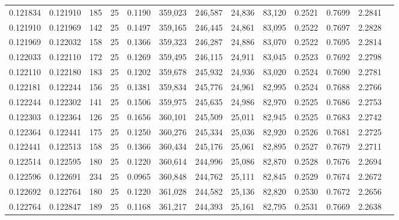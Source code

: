 \begin{tabular}{rrrrrrrrrrrrr}
0.121834 & 0.121910 &   185 &  25 &                                     0.1190 & 359,023 & 246,587 &  24,836 &  83,120 & 0.2521 & 0.7699 & 2.2841 \\
0.121910 & 0.121969 &   142 &  25 &                                     0.1497 & 359,165 & 246,445 &  24,861 &  83,095 & 0.2522 & 0.7697 & 2.2828 \\
0.121969 & 0.122032 &   158 &  25 &                                     0.1366 & 359,323 & 246,287 &  24,886 &  83,070 & 0.2522 & 0.7695 & 2.2814 \\
0.122033 & 0.122110 &   172 &  25 &                                     0.1269 & 359,495 & 246,115 &  24,911 &  83,045 & 0.2523 & 0.7692 & 2.2798 \\
0.122110 & 0.122180 &   183 &  25 &                                     0.1202 & 359,678 & 245,932 &  24,936 &  83,020 & 0.2524 & 0.7690 & 2.2781 \\
0.122181 & 0.122244 &   156 &  25 &                                     0.1381 & 359,834 & 245,776 &  24,961 &  82,995 & 0.2524 & 0.7688 & 2.2766 \\
0.122244 & 0.122302 &   141 &  25 &                                     0.1506 & 359,975 & 245,635 &  24,986 &  82,970 & 0.2525 & 0.7686 & 2.2753 \\
0.122303 & 0.122364 &   126 &  25 &                                     0.1656 & 360,101 & 245,509 &  25,011 &  82,945 & 0.2525 & 0.7683 & 2.2742 \\
0.122364 & 0.122441 &   175 &  25 &                                     0.1250 & 360,276 & 245,334 &  25,036 &  82,920 & 0.2526 & 0.7681 & 2.2725 \\
0.122441 & 0.122513 &   158 &  25 &                                     0.1366 & 360,434 & 245,176 &  25,061 &  82,895 & 0.2527 & 0.7679 & 2.2711 \\
0.122514 & 0.122595 &   180 &  25 &                                     0.1220 & 360,614 & 244,996 &  25,086 &  82,870 & 0.2528 & 0.7676 & 2.2694 \\
0.122596 & 0.122691 &   234 &  25 &                                     0.0965 & 360,848 & 244,762 &  25,111 &  82,845 & 0.2529 & 0.7674 & 2.2672 \\
0.122692 & 0.122764 &   180 &  25 &                                     0.1220 & 361,028 & 244,582 &  25,136 &  82,820 & 0.2530 & 0.7672 & 2.2656 \\
0.122764 & 0.122847 &   189 &  25 &                                     0.1168 & 361,217 & 244,393 &  25,161 &  82,795 & 0.2531 & 0.7669 & 2.2638 \\

\end{tabular}
